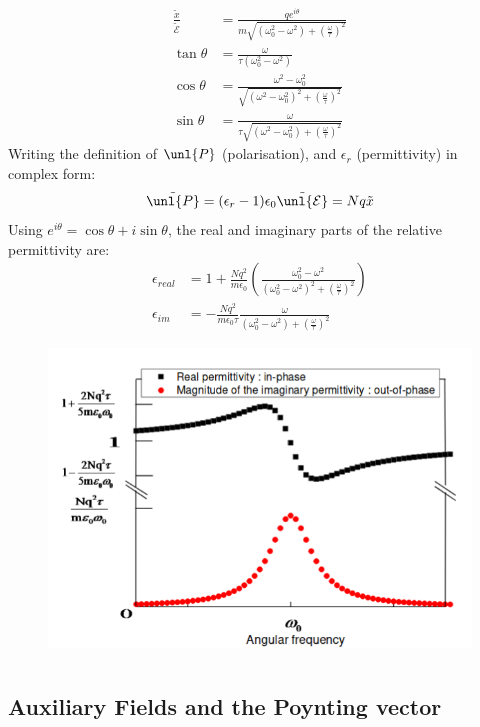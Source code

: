 \documentclass[a4paper, 11pt, normalem]{report}
\newcommand\E{\mathcal{E}}
\newcommand\uE{\unl{\E}}
\newcommand\eno{\epsilon_0}
\newcommand\om{\omega}
\newcommand\er{\epsilon_r}
\newcommand\e{\epsilon}
\newcommand\tx{\tilde{x}}
\begin{document}
\begin{align*}
	\frac{\tx}{\tilde{\E}} &= \frac{qe^{i\theta}}{m\sqrt{(\om_0^2 - \om^2) + \left(\frac{\om}{\tau}\right)^2}} \\
	\tan\theta &= \frac{\om}{\tau(\om_0^2 - \om^2)} \\
	\cos\theta &= \frac{\om^2 - \om_0^2}{\sqrt{(\om^2 - \om_0^2)^2 + \left(\frac{\om}{\tau}\right)^2}} \\
	\sin\theta &= \frac{\om}{\tau\sqrt{(\om^2 - \om_0^2) + \left(\frac{\om}{\tau}\right)^2}}
\end{align*}
Writing the definition of $\unl{P}$ (polarisation), and $\er$ (permittivity) in complex form:
\begin{equation*}
	\tilde{\unl{P}} = (\er - 1)\eno\tilde{\uE} = Nq\tx
\end{equation*}
Using $e^{i\theta} = \cos\theta + i\sin\theta$, the real and imaginary parts of the relative permittivity are:
\begin{align*}
	\e_{real} &= 1 + \frac{Nq^2}{m\eno}\left(\frac{\om_0^2 - \om^2}{(\om_0^2 - \om^2)^2 + \left(\frac{\om}{\tau}\right)^2}\right) \\
	\e_{im} &= -\frac{Nq^2}{m\eno\tau}\frac{\om}{(\om_0^2 - \om^2) + \left(\frac{\om}{\tau}\right)^2}
\end{align*}
\begin{figure}[H]
	\centering
	\includegraphics[scale=0.4]{angfreq.png}
\end{figure}

\chapter{}
\section{Auxiliary Fields and the Poynting vector}
\end{document}
